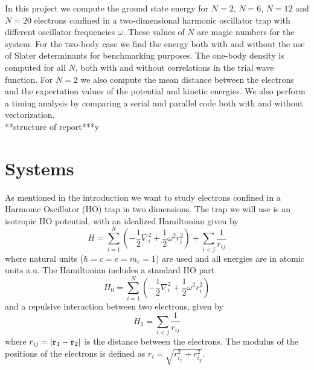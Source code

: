 \documentclass[english, a4paper]{article}
\begin{document}
\noindent In this project we compute the ground state energy for
$N=2$, $N=6$, $N=12$ and $N=20$ electrons
confined in a two-dimensional harmonic oscillator trap with different oscillator frequencies $\omega$.
These values of $N$ are magic numbers for the system.
For the two-body case we find the energy both with and without the use of Slater determinants for 
benchmarking purposes. The one-body density is computed for all $N$, both with and without correlations
in the trial wave function. 
For $N=2$ we also compute the mean distance between the electrons and the expectation values of the potential
and kinetic energies. We also perform a timing analysis by comparing a serial and parallel code both with 
and without vectorization.\\

\noindent ***structure of report***y

\section{Systems}
As mentioned in the introduction we want to study electrons confined in a Harmonic Oscillator (HO) trap in two dimensions. The trap we will use 
is an isotropic HO potential, with an idealized Hamiltonian given by
\begin{equation}
 H = \sum_{i=1}^N\left(-\frac{1}{2} \nabla_i^2 + \frac{1}{2} \omega^2 r_i^2 \right) + \sum_{i<j} \frac{1}{r_{ij}}
\end{equation}
where natural units ($\hbar = c = e = m_e = 1$) are used and all energies are in atomic units a.u. The Hamiltonian includes a standard HO part
\begin{equation*}
 H_0 = \sum_{i=1}^N \left( -\frac{1}{2}\nabla_i^2 + \frac{1}{2}\omega^2 r_i^2 \right)
\end{equation*}
and a repulsive interaction between two electrons, given by
\begin{equation*}
 H_1 = \sum_{i < j} \frac{1}{r_{ij}}
\end{equation*}
where $r_{ij} = |{\bf r}_1 - {\bf r}_2|$ is the distance between the electrons. The modulus of the positions of the electrons is defined as $r_i = \sqrt{r_{i_x}^2 + r_{i_y}^2}$.
\end{document}
